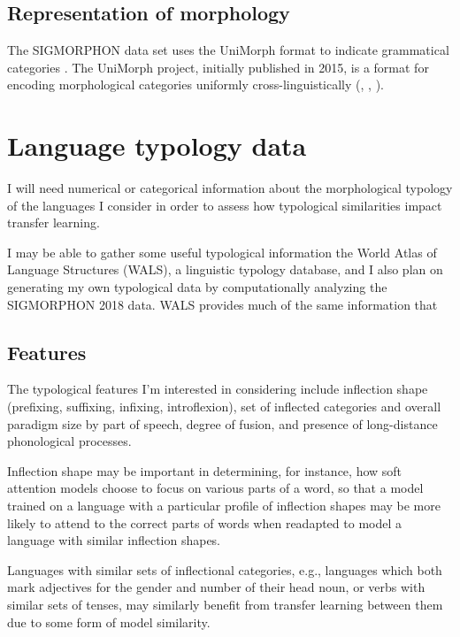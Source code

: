 \subsection{Representation of morphology}

The SIGMORPHON data set uses the UniMorph format to indicate grammatical categories  \parencite{Cotterell2018b}. The UniMorph project, initially published in 2015, is a format for encoding morphological categories uniformly cross-linguistically (\cite{SylakGlassman2015}, \cite{SylakGlassman2015a}, \cite{SylakGlassman2016}).

\section{Language typology data}

I will need numerical or categorical information about the morphological typology of the languages I consider in order to assess how typological similarities impact transfer learning. 

I may be able to gather some useful typological information the World Atlas of Language Structures (WALS), a linguistic typology database, and I also plan on generating my own typological data by computationally analyzing the SIGMORPHON 2018 data. WALS provides much of the same information that 

\subsection{Features}

The typological features I'm interested in considering include inflection shape (prefixing, suffixing, infixing, introflexion), set of inflected categories and overall paradigm size by part of speech, degree of fusion, and presence of long-distance phonological processes. 

Inflection shape may be important in determining, for instance, how soft attention models choose to focus on various parts of a word, so that a model trained on a language with a particular profile of inflection shapes may be more likely to attend to the correct parts of words when readapted to model a language with similar inflection shapes. 

Languages with similar sets of inflectional categories, e.g., languages which both mark adjectives for the gender and number of their head noun, or verbs with similar sets of tenses, may similarly benefit from transfer learning between them due to some form of model similarity. 

